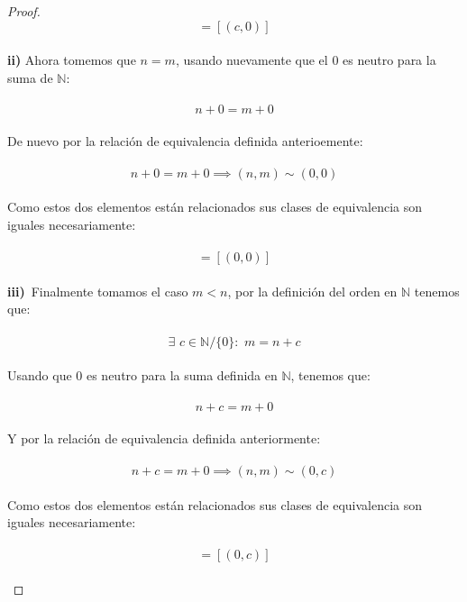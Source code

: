 \documentclass[11pt,letterpaper]{article}
\newcommand{\N}{\mathbb{N}}
\begin{document}
\begin{proof}
    \begin{equation*}
        [(n,m)]=[(c,0)]
    \end{equation*}\,\\
    \textbf{ii)}\,\,Ahora tomemos que $n=m$, usando nuevamente que el $0$ es neutro para la suma de $\N$:\,\\
    \,\\
    \begin{equation*}
        n+0=m+0
    \end{equation*}\,\\
    De nuevo por la relaci\'on de equivalencia definida anterioemente:\,\\
    \,\\
    \begin{equation*}
        n+0=m+0\implies (n,m)\sim(0,0)
    \end{equation*}\,\\
    Como estos dos elementos est\'an relacionados sus clases de equivalencia son iguales necesariamente:\,\\
    \,\\
    \begin{equation*}
        [(n,m)]=[(0,0)]
    \end{equation*}\,\\
    \textbf{iii)}\,\,\,Finalmente tomamos el caso $m<n$, por la definici\'on del orden en $\N$ tenemos que:\,\\
    \,\\
    \begin{equation*}
        \exists\,\,c\in \N/\{0\}:\,\,m=n+c
    \end{equation*}\,\\
    Usando que $0$ es neutro para la suma definida en $\N$, tenemos que:\,\\
    \,\\
    \begin{equation*}
    n+c=m+0
    \end{equation*}\,\\
    Y por la relaci\'on de equivalencia definida anteriormente:\,\\
    \,\\
    \begin{equation*}
        n+c=m+0\implies (n,m)\sim(0,c)
    \end{equation*}\,\\
    Como estos dos elementos est\'an relacionados sus clases de equivalencia son iguales necesariamente:\,\\
    \,\\
    \begin{equation*}
        [(n,m)]=[(0,c)]
    \end{equation*}\,\\
\end{proof}\,\\
\end{document}
